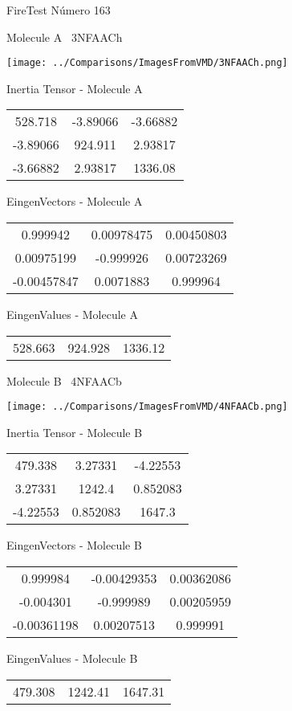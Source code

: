 \vtab[-3cm]
\begin{center}
{\large FireTest \tab Número 163}
\end{center}
\begin{multicols}{2}
\begin{center}

Molecule A \
3NFAACh

\texttt{[image: ../Comparisons/ImagesFromVMD/3NFAACh.png]}

Inertia Tensor - Molecule A \\
\begin{tabular}{|c c c|}
528.718	 & 	-3.89066	 & 	-3.66882	 \\
-3.89066	 & 	924.911	 & 	2.93817	 \\
-3.66882	 & 	2.93817	 & 	1336.08
\end{tabular}

\vtab
 EingenVectors - Molecule A     \\
\begin{tabular}{|c c c|}
0.999942	 & 	0.00978475	 & 	0.00450803	 \\
0.00975199	 & 	-0.999926	 & 	0.00723269	 \\
-0.00457847	 & 	0.0071883	 & 	0.999964
\end{tabular}

\vtab
 EingenValues - Molecule A     \\
\begin{tabular}{|c c c|}
528.663	 & 	924.928	 & 	1336.12	 \\
\end{tabular}
\columnbreak

Molecule B \
4NFAACb

\texttt{[image: ../Comparisons/ImagesFromVMD/4NFAACb.png]}

Inertia Tensor - Molecule B \\
\begin{tabular}{|c c c|}
479.338	 & 	3.27331	 & 	-4.22553	 \\
3.27331	 & 	1242.4	 & 	0.852083	 \\
-4.22553	 & 	0.852083	 & 	1647.3
\end{tabular}

\vtab
 EingenVectors - Molecule B     \\
\begin{tabular}{|c c c|}
0.999984	 & 	-0.00429353	 & 	0.00362086	 \\
-0.004301	 & 	-0.999989	 & 	0.00205959	 \\
-0.00361198	 & 	0.00207513	 & 	0.999991
\end{tabular}

\vtab
 EingenValues - Molecule B     \\
\begin{tabular}{|c c c|}
479.308	 & 	1242.41	 & 	1647.31	 \\
\end{tabular}

\end{center}
\end{multicols}

